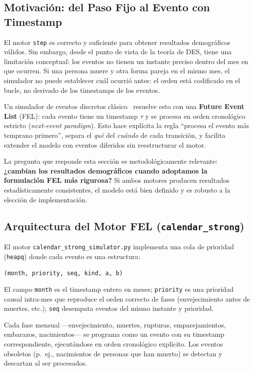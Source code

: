 \documentclass{llncs}
\begin{document}
\subsection{Motivación: del Paso Fijo al Evento con Timestamp}

El motor \texttt{step} es correcto y suficiente para obtener resultados
demográficos válidos.
Sin embargo, desde el punto de vista de la teoría de DES, tiene una
limitación conceptual: los eventos no tienen un instante preciso dentro
del mes en que ocurren.
Si una persona muere y otra forma pareja en el mismo mes, el simulador no
puede establecer cuál ocurrió antes: el orden está codificado en el bucle,
no derivado de los timestamps de los eventos.

Un simulador de eventos discretos clásico~\cite{banks2001} resuelve esto
con una \textbf{Future Event List} (FEL): cada evento tiene un timestamp
$\tau$ y se procesa en orden cronológico estricto (\emph{next-event
paradigm}).
Esto hace explícita la regla ``procesa el evento más temprano primero'',
separa el \emph{qué} del \emph{cuándo} de cada transición, y facilita
extender el modelo con eventos diferidos sin reestructurar el motor.

La pregunta que responde esta sección es metodológicamente relevante:
\textbf{¿cambian los resultados demográficos cuando adoptamos la
formulación FEL más rigurosa?}
Si ambos motores producen resultados estadísticamente consistentes, el
modelo está bien definido y es robusto a la elección de implementación.

\subsection{Arquitectura del Motor FEL (\texttt{calendar\_strong})}

El motor \texttt{calendar\_strong\_simulator.py} implementa una cola de
prioridad (\texttt{heapq}) donde cada evento es una estructura:
\begin{center}
\texttt{(month, priority, seq, kind, a, b)}
\end{center}
El campo \texttt{month} es el timestamp entero en meses;
\texttt{priority} es una prioridad causal intra-mes que reproduce el orden
correcto de fases (envejecimiento antes de muertes, etc.);
\texttt{seq} desempata eventos del mismo instante y prioridad.

Cada fase mensual ---envejecimiento, muertes, rupturas, emparejamientos,
embarazos, nacimientos--- se programa como un evento con su timestamp
correspondiente, ejecutándose en orden cronológico explícito.
Los eventos obsoletos (p.~ej., nacimientos de personas que han muerto)
se detectan y descartan al ser procesados.
\end{document}
